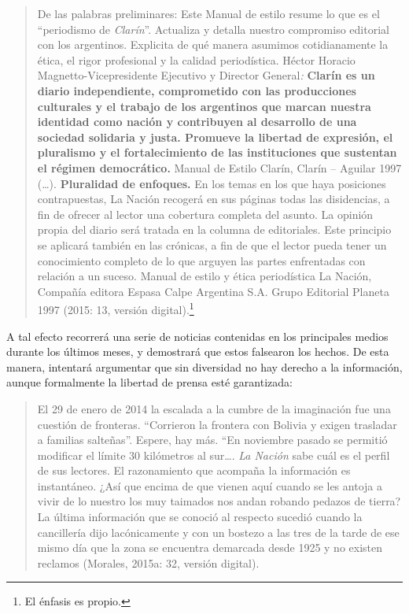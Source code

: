 {\begin{quote}
De las palabras preliminares: Este Manual de estilo resume lo que es el ``periodismo de \emph{Clarín}''. Actualiza y detalla nuestro compromiso editorial con los argentinos. Explicita de qué manera asumimos cotidianamente la ética, el rigor profesional y la calidad periodística. Héctor Horacio Magnetto-Vicepresidente Ejecutivo y Director General\emph{:} \textbf{Clarín es un diario independiente, comprometido con las producciones culturales y el trabajo de los argentinos que marcan nuestra identidad como nación y contribuyen al desarrollo de una sociedad solidaria y justa. Promueve la libertad de expresión, el pluralismo y el fortalecimiento de las instituciones que sustentan el régimen democrático.} Manual de Estilo Clarín, Clarín -- Aguilar 1997 (\ldots). \textbf{Pluralidad de enfoques.} En los temas en los que haya posiciones contrapuestas, La Nación recogerá en sus páginas todas las disidencias, a fin de ofrecer al lector una cobertura completa del asunto. La opinión propia del diario será tratada en la columna de editoriales. Este principio se aplicará también en las crónicas, a fin de que el lector pueda tener un conocimiento completo de lo que arguyen las partes enfrentadas con relación a un suceso. Manual de estilo y ética periodística La Nación, Compañía editora Espasa Calpe Argentina S.A. Grupo Editorial Planeta 1997 (2015: 13, versión digital).\footnote{El énfasis es propio.}
\end{quote}

A tal efecto recorrerá una serie de noticias contenidas en los principales medios durante los últimos meses, y demostrará que estos falsearon los hechos. De esta manera, intentará argumentar que sin diversidad no hay derecho a la información, aunque formalmente la libertad de prensa esté garantizada:

\begin{quote}
El 29 de enero de 2014 la escalada a la cumbre de la imaginación fue una cuestión de fronteras. ``Corrieron la frontera con Bolivia y exigen trasladar a familias salteñas''. Espere, hay más. ``En noviembre pasado se permitió modificar el límite 30 kilómetros al sur\ldots. \emph{La Nación} sabe cuál es el perfil de sus lectores. El razonamiento que acompaña la información es instantáneo. ¿Así que encima de que vienen aquí cuando se les antoja a vivir de lo nuestro los muy taimados nos andan robando pedazos de tierra? La última información que se conoció al respecto sucedió cuando la cancillería dijo lacónicamente y con un bostezo a las tres de la tarde de ese mismo día que la zona se encuentra demarcada desde 1925 y no existen reclamos (Morales, 2015a: 32, versión digital).
\end{quote}

}
